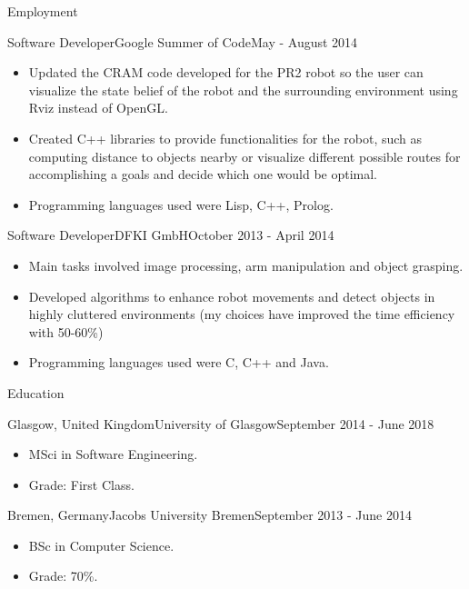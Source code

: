 \documentclass[]{cv}
\begin{document}
\begin{cvsection}{Employment}
		\begin{cvsubsection}{Software Developer}{Google Summer of Code}{May - August 2014}
			\begin{itemize}
				\item Updated the CRAM code developed for the PR2 robot so the user can visualize the state belief of the 
				robot and the surrounding environment using Rviz instead of OpenGL.
				\item Created C++ libraries to provide functionalities for the robot, such as computing distance to objects 
				nearby or visualize different possible routes for accomplishing a goals and decide which one would be optimal.
				\item Programming languages used were Lisp, C++, Prolog.
			\end{itemize}
		\end{cvsubsection}

		\begin{cvsubsection}{Software Developer}{DFKI GmbH}{October 2013 - April 2014}
			\begin{itemize}
				\item Main tasks involved image processing, arm manipulation and object grasping.
				\item Developed algorithms to enhance robot movements and detect objects in highly cluttered environments (my
				choices have improved the time efficiency with 50-60\%)
				\item Programming languages used were C, C++ and Java.
			\end{itemize}
		\end{cvsubsection}

	\end{cvsection}
	
	\begin{cvsection}{Education}
		\begin{cvsubsection}{Glasgow, United Kingdom}{University of Glasgow}{September 2014 - June 2018}
			\begin{itemize}
				\item MSci in Software Engineering.
				\item Grade: First Class.
			\end{itemize}
		\end{cvsubsection}
		\begin{cvsubsection}{Bremen, Germany}{Jacobs University Bremen}{September 2013 - June 2014}
			\begin{itemize}
				\item BSc in Computer Science.
				\item Grade: 70\%.
			\end{itemize}
		\end{cvsubsection}

	\end{cvsection}
	
\end{document}
